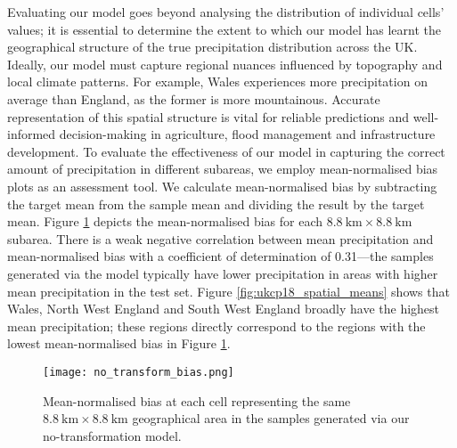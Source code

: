 \documentclass[ oneside,%
                    author={George Herbert},
                    degree={MSci},
                     title={Diffusion Models for Time-Evolving Precipitation Fields},
                  subtitle={}]{dissertation}
\begin{document}
Evaluating our model goes beyond analysing the distribution of individual cells' values; it is essential to determine the extent to which our model has learnt the geographical structure of the true precipitation distribution across the UK. Ideally, our model must capture regional nuances influenced by topography and local climate patterns. For example, Wales experiences more precipitation on average than England, as the former is more mountainous. Accurate representation of this spatial structure is vital for reliable predictions and well-informed decision-making in agriculture, flood management and infrastructure development. To evaluate the effectiveness of our model in capturing the correct amount of precipitation in different subareas, we employ mean-normalised bias plots as an assessment tool. We calculate mean-normalised bias by subtracting the target mean from the sample mean and dividing the result by the target mean. Figure \ref{fig:no_transform_bias} depicts the mean-normalised bias for each $8.8\ \mathrm{km}\times8.8\ \mathrm{km}$ subarea. There is a weak negative correlation between mean precipitation and mean-normalised bias with a coefficient of determination of 0.31---the samples generated via the model typically have lower precipitation in areas with higher mean precipitation in the test set. Figure \ref{fig:ukcp18_spatial_means} shows that Wales, North West England and South West England broadly have the highest mean precipitation; these regions directly correspond to the regions with the lowest mean-normalised bias in Figure \ref{fig:no_transform_bias}.

\begin{figure}[htbp]
      \centering
      \texttt{[image: no\_transform\_bias.png]}
      \caption{Mean-normalised bias at each cell representing the same $8.8\ \mathrm{km}\times 8.8\ \mathrm{km}$ geographical area in the samples generated via our no-transformation model.}
      \label{fig:no_transform_bias}
\end{figure}
\end{document}
